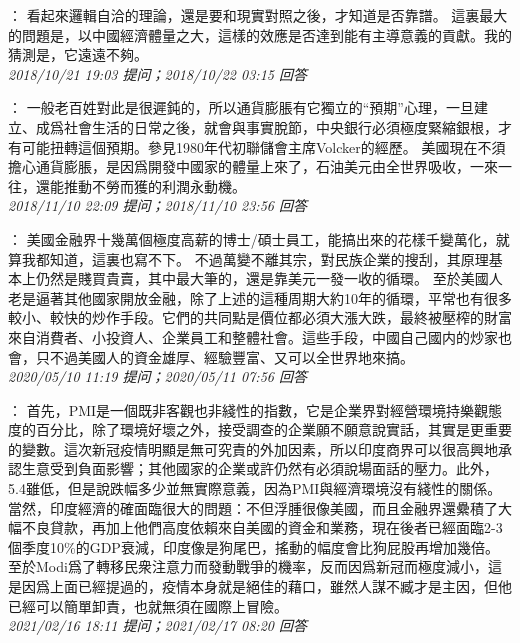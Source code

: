 \documentclass[twocolumn]{ctexart}
\begin{document}
：
看起來邏輯自洽的理論，還是要和現實對照之後，才知道是否靠譜。
這裏最大的問題是，以中國經濟體量之大，這樣的效應是否達到能有主導意義的貢獻。我的猜測是，它遠遠不夠。
\\

\textit{\hfill\noindent\small 2018/10/21 19:03 提问；2018/10/22 03:15 回答}

：
一般老百姓對此是很遲鈍的，所以通貨膨脹有它獨立的“預期”心理，一旦建立、成爲社會生活的日常之後，就會與事實脫節，中央銀行必須極度緊縮銀根，才有可能扭轉這個預期。參見1980年代初聯儲會主席Volcker的經歷。
美國現在不須擔心通貨膨脹，是因爲開發中國家的體量上來了，石油美元由全世界吸收，一來一往，還能推動不勞而獲的利潤永動機。
\\

\textit{\hfill\noindent\small 2018/11/10 22:09 提问；2018/11/10 23:56 回答}

：
美國金融界十幾萬個極度高薪的博士/碩士員工，能搞出來的花樣千變萬化，就算我都知道，這裏也寫不下。
不過萬變不離其宗，對民族企業的搜刮，其原理基本上仍然是賤買貴賣，其中最大筆的，還是靠美元一發一收的循環。
至於美國人老是逼著其他國家開放金融，除了上述的這種周期大約10年的循環，平常也有很多較小、較快的炒作手段。它們的共同點是價位都必須大漲大跌，最終被壓榨的財富來自消費者、小投資人、企業員工和整體社會。這些手段，中國自己國内的炒家也會，只不過美國人的資金雄厚、經驗豐富、又可以全世界地來搞。
\\

\textit{\hfill\noindent\small 2020/05/10 11:19 提问；2020/05/11 07:56 回答}

：
首先，PMI是一個既非客觀也非綫性的指數，它是企業界對經營環境持樂觀態度的百分比，除了環境好壞之外，接受調查的企業願不願意說實話，其實是更重要的變數。這次新冠疫情明顯是無可究責的外加因素，所以印度商界可以很高興地承認生意受到負面影響；其他國家的企業或許仍然有必須說場面話的壓力。此外，5.4雖低，但是說跌幅多少並無實際意義，因為PMI與經濟環境沒有綫性的關係。 
當然，印度經濟的確面臨很大的問題：不但浮腫很像美國，而且金融界還纍積了大幅不良貸款，再加上他們高度依賴來自美國的資金和業務，現在後者已經面臨2-3個季度10\%的GDP衰減，印度像是狗尾巴，搖動的幅度會比狗屁股再增加幾倍。 
至於Modi爲了轉移民衆注意力而發動戰爭的機率，反而因爲新冠而極度減小，這是因爲上面已經提過的，疫情本身就是絕佳的藉口，雖然人謀不臧才是主因，但他已經可以簡單卸責，也就無須在國際上冒險。
\\

\textit{\hfill\noindent\small 2021/02/16 18:11 提问；2021/02/17 08:20 回答}
\end{document}
